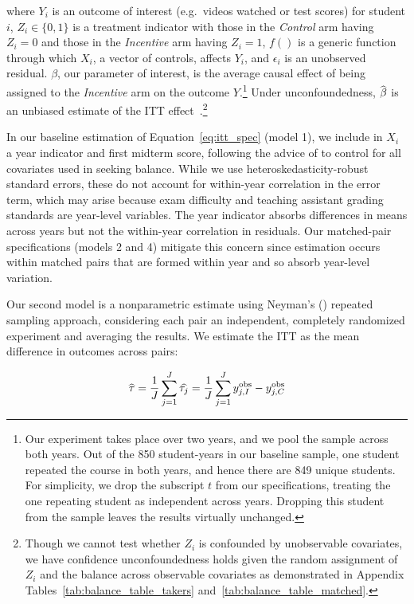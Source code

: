 where $Y_i$ is an outcome of interest (e.g.\ videos watched or test scores) for student $i$, $Z_i \in \{0,1\}$ is a treatment indicator with those in the \textit{Control} arm having $Z_i=0$ and those in the \textit{Incentive} arm having $Z_i=1$, $f()$ is a generic function through which $X_i$, a vector of controls, affects $Y_i$, and $\epsilon_i$ is an unobserved residual.
$\beta$, our parameter of interest, is the average causal effect of being assigned to the \textit{Incentive} arm on the outcome $Y$.\footnote{Our experiment takes place over two years, and we pool the sample across both years.
	Out of the 850 student-years in our baseline sample, one student repeated the course in both years, and hence there are 849 unique students.
	For simplicity, we drop the subscript $t$ from our specifications, treating the one repeating student as independent across years.
	Dropping this student from the sample leaves the results virtually unchanged.
}
Under unconfoundedness, $\wh{\beta}$ is an unbiased estimate of the ITT effect~\parencite{ir2015}.\footnote{Though we cannot test whether $Z_i$ is confounded by unobservable covariates, we have confidence unconfoundedness holds given the random assignment of $Z_i$ and the balance across observable covariates as demonstrated in Appendix Tables~\ref{tab:balance_table_takers} and~\ref{tab:balance_table_matched}.}

In our baseline estimation of Equation~\ref{eq:itt_spec} (model 1), we include in $X_i$ a year indicator and first midterm score, following the advice of \textcite{bm2009} to control for all covariates used in seeking balance.
While we use heteroskedasticity-robust standard errors, these do not account for within-year correlation in the error term, which may arise because exam difficulty and teaching assistant grading standards are year-level variables.
The year indicator absorbs differences in means across years but not the within-year correlation in residuals.
Our matched-pair specifications (models 2 and 4) mitigate this concern since estimation occurs within matched pairs that are formed within year and so absorb year-level variation.

Our second model is a nonparametric estimate using Neyman's (\citeyear{neyman1923}) repeated sampling approach, considering each pair an independent, completely randomized experiment and averaging the results.
We estimate the ITT as the mean difference in outcomes across pairs:

\begin{equation} \label{eq:neyman_spec}
	\wh{\tau} = \frac{1}{J}\sum_{j=1}^{J} \wh{\tau_j} = \frac{1}{J}\sum_{j=1}^{J} y^\text{obs}_{j,I} - y^\text{obs}_{j,C}
\end{equation}

